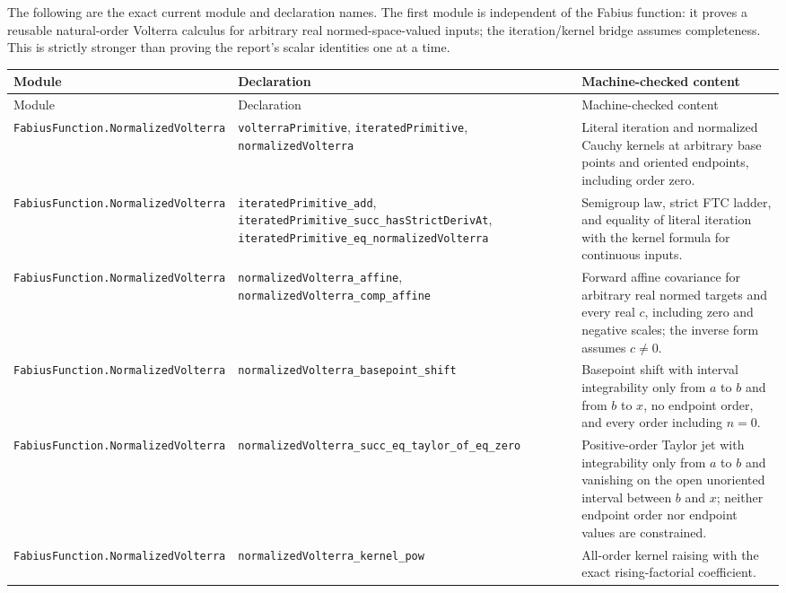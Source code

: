 \documentclass[11pt,oneside]{article}
\numberwithin{equation}{section}
\theoremstyle{definition}
\theoremstyle{remark}
\newcommand{\decl}[1]{\nolinkurl{#1}}
\begin{document}
The following are the exact current module and declaration names.  The first
module is independent of the Fabius function: it proves a reusable
natural-order Volterra calculus for arbitrary real normed-space-valued inputs;
the iteration/kernel bridge assumes completeness.  This is strictly stronger
than proving the report's scalar identities one at a time.

\begingroup
\footnotesize
\begin{longtable}{@{}>{\raggedright\arraybackslash}p{}>{\raggedright\arraybackslash}p{}>{\raggedright\arraybackslash}p{}@{}}
\toprule
Module & Declaration & Machine-checked content \\
\midrule
\endfirsthead
\toprule
Module & Declaration & Machine-checked content \\
\midrule
\endhead
\decl{FabiusFunction.NormalizedVolterra} &
\decl{volterraPrimitive}, \decl{iteratedPrimitive},
\decl{normalizedVolterra} &
Literal iteration and normalized Cauchy kernels at arbitrary base points and
oriented endpoints, including order zero. \\
\decl{FabiusFunction.NormalizedVolterra} &
\decl{iteratedPrimitive_add},
\decl{iteratedPrimitive_succ_hasStrictDerivAt},
\decl{iteratedPrimitive_eq_normalizedVolterra} &
Semigroup law, strict FTC ladder, and equality of literal iteration with the
kernel formula for continuous inputs. \\
\decl{FabiusFunction.NormalizedVolterra} &
\decl{normalizedVolterra_affine},
\decl{normalizedVolterra_comp_affine} &
Forward affine covariance for arbitrary real normed targets and every real
\(c\), including zero and negative scales; the inverse form assumes
\(c\ne0\). \\
\decl{FabiusFunction.NormalizedVolterra} &
\decl{normalizedVolterra_basepoint_shift} &
Basepoint shift with interval integrability only from \(a\) to \(b\) and from
\(b\) to \(x\), no endpoint order, and every order including \(n=0\). \\
\decl{FabiusFunction.NormalizedVolterra} &
\decl{normalizedVolterra_succ_eq_taylor_of_eq_zero} &
Positive-order Taylor jet with integrability only from \(a\) to \(b\) and
vanishing on the open unoriented interval between \(b\) and \(x\); neither
endpoint order nor endpoint values are constrained. \\
\decl{FabiusFunction.NormalizedVolterra} &
\decl{normalizedVolterra_kernel_pow} &
All-order kernel raising with the exact rising-factorial coefficient. \\

\end{longtable}
\end{document}
